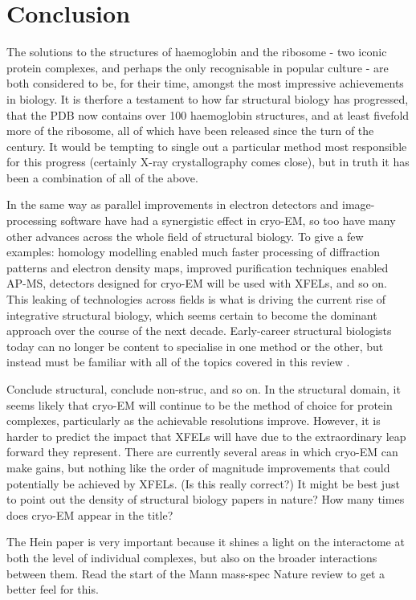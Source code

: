 \documentclass[a4paper,11pt,twoside,openright]{scrbook}
\begin{document}
\section{Conclusion}
The solutions to the structures of haemoglobin and the ribosome - two iconic protein complexes, and perhaps the only recognisable in popular culture - are both considered to be, for their time, amongst the most impressive achievements in biology. It is therfore a testament to how far structural biology has progressed, that the PDB now contains over 100 haemoglobin structures, and at least fivefold more of the ribosome, all of which have been released since the turn of the century. It would be tempting to single out a particular method most responsible for this progress (certainly X-ray crystallography comes close), but in truth it has been a combination of all of the above.

In the same way as parallel improvements in electron detectors and image-processing software have had a synergistic effect in cryo-EM, so too have many other advances across the whole field of structural biology. To give a few examples: homology modelling enabled much faster processing of diffraction patterns and electron density maps, improved purification techniques enabled AP-MS, detectors designed for cryo-EM will be used with XFELs, and so on. This leaking of technologies across fields is what is driving the current rise of integrative structural biology, which seems certain to become the dominant approach over the course of the next decade. Early-career structural biologists today can no longer be content to specialise in one method or the other, but instead must be familiar with all of the topics covered in this review \cite{Shi2014,Cassiday2014}.




Conclude structural, conclude non-struc, and so on. In the structural domain, it seems likely that cryo-EM will continue to be the method of choice for protein complexes, particularly as the achievable resolutions improve. However, it is harder to predict the impact that XFELs will have due to the extraordinary leap forward they represent. There are currently several areas in which cryo-EM can make gains, but nothing like the order of magnitude improvements that could potentially be achieved by XFELs. (Is this really correct?) It might be best just to point out the density of structural biology papers in nature? How many times does cryo-EM appear in the title?

The Hein paper is very important because it shines a light on the interactome at both the level of individual complexes, but also on the broader interactions between them. Read the start of the Mann mass-spec Nature review to get a better feel for this.
\end{document}
